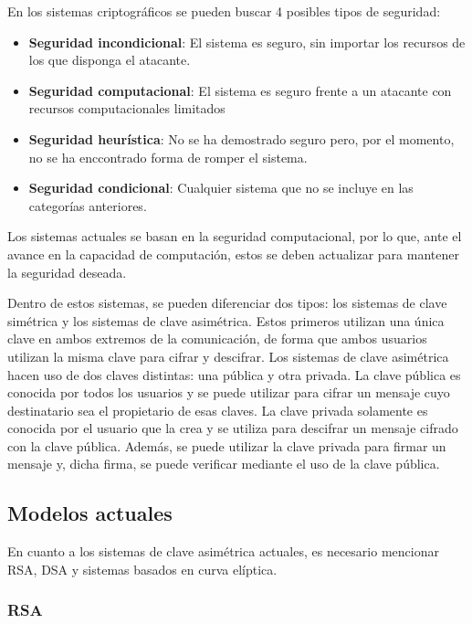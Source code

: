 En los sistemas criptográficos se pueden buscar 4 posibles tipos de seguridad:

\begin{itemize}
    \item \textbf{Seguridad incondicional}: El sistema es seguro, sin importar los recursos de los que disponga el atacante.
    \item \textbf{Seguridad computacional}: El sistema es seguro frente a un atacante con recursos computacionales limitados
    \item \textbf{Seguridad heurística}: No se ha demostrado seguro pero, por el momento, no se ha enccontrado forma de romper el sistema.
    \item \textbf{Seguridad condicional}: Cualquier sistema que no se incluye en las categorías anteriores.
\end{itemize}

Los sistemas actuales se basan en la seguridad computacional, por lo que, ante el avance en la capacidad de computación, estos se deben actualizar para mantener la seguridad deseada.

Dentro de estos sistemas, se pueden diferenciar dos tipos: los sistemas de clave simétrica y los sistemas de clave asimétrica.
Estos primeros utilizan una única clave en ambos extremos de la comunicación, de forma que ambos usuarios utilizan la misma clave para cifrar y descifrar.
Los sistemas de clave asimétrica hacen uso de dos claves distintas: una pública y otra privada.
La clave pública es conocida por todos los usuarios y se puede utilizar para cifrar un mensaje cuyo destinatario sea el propietario de esas claves.
La clave privada solamente es conocida por el usuario que la crea y se utiliza para descifrar un mensaje cifrado con la clave pública.
Además, se puede utilizar la clave privada para firmar un mensaje y, dicha firma, se puede verificar mediante el uso de la clave pública.


\subsection{Modelos actuales}\label{subsec:mod_act}

En cuanto a los sistemas de clave asimétrica actuales, es necesario mencionar RSA, DSA y sistemas basados en curva elíptica.


\subsubsection{RSA}\label{subsubsec:rsa}

